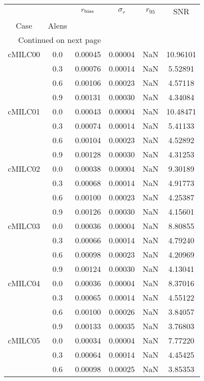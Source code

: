 \begin{longtable}{cccccc}
\toprule
        &     &  $r_{\rm bias}$  &  $\sigma_r$ &  $r_{95}$ &      SNR \\
Case & Alens &                  &             &           &          \\
\midrule
\endhead
\midrule
\multicolumn{3}{r}{{Continued on next page}} \\
\midrule
\endfoot

\bottomrule
\endlastfoot
cMILC00 & 0.0 & 0.00045 & 0.00004 & NaN & 10.96101 \\
        & 0.3 & 0.00076 & 0.00014 & NaN & 5.52891 \\
        & 0.6 & 0.00106 & 0.00023 & NaN & 4.57118 \\
        & 0.9 & 0.00131 & 0.00030 & NaN & 4.34084 \\
cMILC01 & 0.0 & 0.00043 & 0.00004 & NaN & 10.48471 \\
        & 0.3 & 0.00074 & 0.00014 & NaN & 5.41133 \\
        & 0.6 & 0.00104 & 0.00023 & NaN & 4.52892 \\
        & 0.9 & 0.00128 & 0.00030 & NaN & 4.31253 \\
cMILC02 & 0.0 & 0.00038 & 0.00004 & NaN & 9.30189 \\
        & 0.3 & 0.00068 & 0.00014 & NaN & 4.91773 \\
        & 0.6 & 0.00100 & 0.00023 & NaN & 4.25387 \\
        & 0.9 & 0.00126 & 0.00030 & NaN & 4.15601 \\
cMILC03 & 0.0 & 0.00036 & 0.00004 & NaN & 8.80855 \\
        & 0.3 & 0.00066 & 0.00014 & NaN & 4.79240 \\
        & 0.6 & 0.00098 & 0.00023 & NaN & 4.20969 \\
        & 0.9 & 0.00124 & 0.00030 & NaN & 4.13041 \\
cMILC04 & 0.0 & 0.00036 & 0.00004 & NaN & 8.37016 \\
        & 0.3 & 0.00065 & 0.00014 & NaN & 4.55122 \\
        & 0.6 & 0.00100 & 0.00026 & NaN & 3.84057 \\
        & 0.9 & 0.00133 & 0.00035 & NaN & 3.76803 \\
cMILC05 & 0.0 & 0.00034 & 0.00004 & NaN & 7.77220 \\
        & 0.3 & 0.00064 & 0.00014 & NaN & 4.45425 \\
        & 0.6 & 0.00098 & 0.00025 & NaN & 3.85353 \\

\end{longtable}
